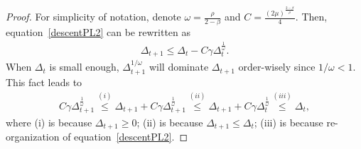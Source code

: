 \documentclass[10pt]{article} %
\def\eqref#1{equation~\ref{#1}}
\newtheorem{proof}{Proof}
\begin{document}
\begin{proof}
For simplicity of notation,  denote $\omega = \frac{\rho}{2-\beta}$ and $C=\frac{ (2\mu)^{\frac{2-\beta}{\rho}}}{4}$. Then,
\eqref{descentPL2} can be rewritten as
\begin{align}
    \Delta_{t+1}\leq \Delta_t - C\gamma\Delta_t^{\frac{1}{\omega}}.
\end{align}
When $\Delta_t$ is small enough,  $\Delta_{t+1}^{{1}/{\omega}}$ will dominate $\Delta_{t+1}$ order-wisely since $1/\omega<1$. This fact leads to
    \begin{align}
        C\gamma \Delta_{t+1}^{\frac{1}{\omega}}\overset{(i)}{\leq} \Delta_{t+1}+ C\gamma \Delta_{t+1}^{\frac{1}{\omega}}\overset{(ii)}{\leq} \Delta_{t+1}+ C\gamma \Delta_{t}^{\frac{1}{\omega}}\overset{(iii)}{\leq} \Delta_t, \nonumber
    \end{align}
    where (i) is because $\Delta_{t+1}\geq 0$; (ii) is because $\Delta_{t+1}\leq \Delta_t$; (iii) is because re-organization of \eqref{descentPL2}. 

\end{proof}
\end{document}
